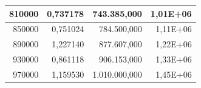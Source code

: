 \documentclass[a4paper, 12pt]{article}
\begin{document}
\begin{longtable}[c]{@{}rrrr@{}}
	\multicolumn{1}{|r|}{810000}                  & \multicolumn{1}{r|}{0,737178}          & \multicolumn{1}{r|}{743.385,000}         & \multicolumn{1}{r|}{1,01E+06}          \\* \midrule
	\multicolumn{1}{|r|}{850000}                  & \multicolumn{1}{r|}{0,751024}          & \multicolumn{1}{r|}{784.500,000}         & \multicolumn{1}{r|}{1,11E+06}          \\* \midrule
	\multicolumn{1}{|r|}{890000}                  & \multicolumn{1}{r|}{1,227140}          & \multicolumn{1}{r|}{877.607,000}         & \multicolumn{1}{r|}{1,22E+06}          \\* \midrule
	\multicolumn{1}{|r|}{930000}                  & \multicolumn{1}{r|}{0,861118}          & \multicolumn{1}{r|}{906.153,000}         & \multicolumn{1}{r|}{1,33E+06}          \\* \midrule
	\multicolumn{1}{|r|}{970000}                  & \multicolumn{1}{r|}{1,159530}          & \multicolumn{1}{r|}{1.010.000,000}       & \multicolumn{1}{r|}{1,45E+06}          \\* \bottomrule
\end{longtable}
\end{document}
